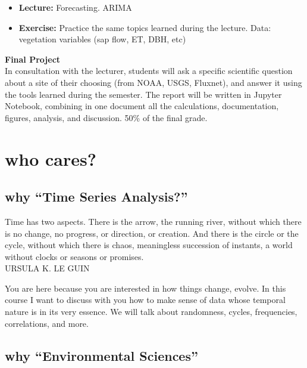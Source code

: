 \documentclass[
  letterpaper,
  DIV=11,
  numbers=noendperiod,
  oneside]{scrreprt}
\providecommand{\tightlist}{%
  \setlength{\itemsep}{0pt}\setlength{\parskip}{0pt}}\usepackage{longtable,booktabs,array}
\begin{document}
\begin{itemize}
\tightlist
\item
  \textbf{Lecture:} Forecasting. ARIMA
\item
  \textbf{Exercise:} Practice the same topics learned during the
  lecture. Data: vegetation variables (sap flow, ET, DBH, etc)
\end{itemize}

\textbf{Final Project}\\
In consultation with the lecturer, students will ask a specific
scientific question about a site of their choosing (from NOAA, USGS,
Fluxnet), and answer it using the tools learned during the semester. The
report will be written in Jupyter Notebook, combining in one document
all the calculations, documentation, figures, analysis, and discussion.
50\% of the final grade.


\hypertarget{who-cares}{%
\chapter*{who cares?}\label{who-cares}}


\hypertarget{why-time-series-analysis}{%
\section*{why ``Time Series
Analysis?''}\label{why-time-series-analysis}}


Time has two aspects. There is the arrow, the running river, without
which there is no change, no progress, or direction, or creation. And
there is the circle or the cycle, without which there is chaos,
meaningless succession of instants, a world without clocks or seasons or
promises.\\
URSULA K. LE GUIN

You are here because you are interested in how things change, evolve. In
this course I want to discuss with you how to make sense of data whose
temporal nature is in its very essence. We will talk about randomness,
cycles, frequencies, correlations, and more.

\hypertarget{why-environmental-sciences}{%
\section*{why ``Environmental
Sciences''}\label{why-environmental-sciences}}
\end{document}
